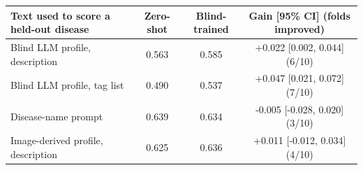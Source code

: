 \begin{tabular}{lccc}\toprule Text used to score a held-out disease & Zero-shot & Blind-trained & Gain [95\% CI] (folds improved)\\\midrule
Blind LLM profile, description & 0.563 & 0.585 & +0.022 [0.002, 0.044] (6/10)\\
Blind LLM profile, tag list & 0.490 & 0.537 & +0.047 [0.021, 0.072] (7/10)\\
Disease-name prompt & 0.639 & 0.634 & -0.005 [-0.028, 0.020] (3/10)\\
Image-derived profile, description & 0.625 & 0.636 & +0.011 [-0.012, 0.034] (4/10)\\
\bottomrule\end{tabular}
